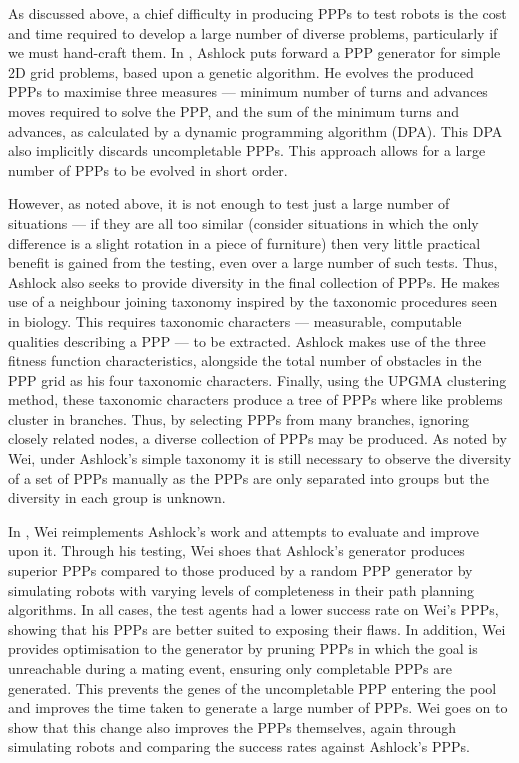 \documentclass[authoryearcitations]{UoYCSproject}
\begin{document}
As discussed above, a chief difficulty in producing PPPs to test robots is the cost and time required to develop a large number of diverse problems, particularly if we must hand-craft them. In \cite{ashlock}, Ashlock puts forward a PPP generator for simple 2D grid problems, based upon a genetic algorithm. He evolves the produced PPPs to maximise three measures --- minimum number of turns and advances moves required to solve the PPP, and the sum of the minimum turns and advances, as calculated by a dynamic programming algorithm (DPA). This DPA also implicitly discards uncompletable PPPs. This approach allows for a large number of PPPs to be evolved in short order.

However, as noted above, it is not enough to test just a large number of situations --- if they are all too similar (consider situations in which the only difference is a slight rotation in a piece of furniture) then very little practical benefit is gained from the testing, even over a large number of such tests. Thus, Ashlock also seeks to provide diversity in the final collection of PPPs. He makes use of a neighbour joining taxonomy inspired by the taxonomic procedures seen in biology. This requires taxonomic characters --- measurable, computable qualities describing a PPP --- to be extracted. Ashlock makes use of the three fitness function characteristics, alongside the total number of obstacles in the PPP grid as his four taxonomic characters. Finally, using the UPGMA clustering method, these taxonomic characters produce a tree of PPPs where like problems cluster in branches. Thus, by selecting PPPs from many branches, ignoring closely related nodes, a diverse collection of PPPs may be produced. As noted by Wei, under Ashlock's simple taxonomy it is still necessary to observe the diversity of a set of PPPs manually as the PPPs are only separated into groups but the diversity in each group is unknown\cite[chapter 8, p.~66]{wei}.

In  \cite{wei}, Wei reimplements Ashlock's work and attempts to evaluate and improve upon it. Through his testing, Wei shoes that Ashlock's generator produces superior PPPs compared to those produced by a random PPP generator by simulating robots with varying levels of completeness in their path planning algorithms. In all cases, the test agents had a lower success rate on Wei's PPPs, showing that his PPPs are better suited to exposing their flaws. In addition, Wei provides optimisation to the generator by pruning PPPs in which the goal is unreachable during a mating event, ensuring only completable PPPs are generated. This prevents the genes of the uncompletable PPP entering the pool and improves the time taken to generate a large number of PPPs. Wei goes on to show that this change also improves the PPPs themselves, again through simulating robots and comparing the success rates against Ashlock's PPPs.
\end{document}
